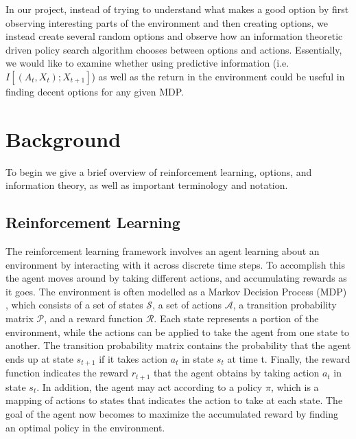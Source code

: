 \documentclass{acm_proc_article-sp}
\begin{document}
In our project, instead of trying to understand what makes a good option by first observing interesting parts of the environment and then creating options, we instead create several random options and observe how an information theoretic driven policy search algorithm \cite{still} chooses between options and actions. Essentially, we would like to examine whether using predictive information (i.e. $I[(A_t,X_t); X_{t+1}]$) as well as the return in the environment could be useful in finding decent options for any given MDP.

\section{Background} %


To begin we give a brief overview of reinforcement learning, options, and information theory, as well as important terminology and notation.

\subsection{Reinforcement Learning}


The reinforcement learning framework involves an agent learning about an environment by interacting with it across discrete time steps. To accomplish this the agent moves around by taking different actions, and accumulating rewards as it goes.
	 The environment is often modelled as a Markov Decision Process (MDP) \cite{Puterman}, which consists of a set of states $\mathcal{S}$, a set of actions $\mathcal{A}$, a transition probability matrix $\mathcal{P}$, and a reward function $\mathcal{R}$. Each state represents a portion of the environment, while the actions can be applied to take the agent from one state to another. 
	 The transition probability matrix contains the probability that the agent ends up at state $s_{t+1}$ if it takes action $a_t$ in state $s_t$ at time t. Finally, the reward function indicates the reward $r_{t+1}$ that the agent obtains by taking action $a_t$ in state $s_t$. In addition, the agent may act according to a policy $\pi$, which is a mapping of actions to states that indicates the action to take at each state. The goal of the agent now becomes to maximize the accumulated reward by finding an optimal policy in the environment.  
	 
\end{document}

